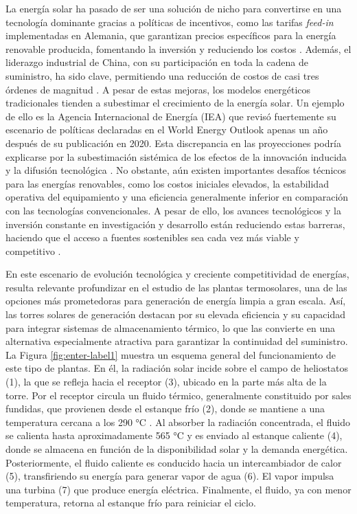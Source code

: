 \documentclass[11pt]{report}
\begin{document}
La energía solar ha pasado de ser una solución de nicho para convertirse en una tecnología dominante gracias a políticas de incentivos, como las tarifas \textit{feed-in} implementadas en Alemania, que garantizan precios específicos para la energía renovable producida, fomentando la inversión y reduciendo los costos \cite{wand2011feed}. Además, el liderazgo industrial de China, con su participación en toda la cadena de suministro, ha sido clave, permitiendo una reducción de costos de casi tres órdenes de magnitud \cite{Way}.
A pesar de estas mejoras, los modelos energéticos tradicionales tienden a subestimar el crecimiento de la energía solar. Un ejemplo de ello es la Agencia Internacional de Energía (IEA) que revisó fuertemente su escenario de políticas declaradas en el World Energy Outlook apenas un año después de su publicación en 2020. Esta discrepancia en las proyecciones podría explicarse por la subestimación sistémica de los efectos de la innovación inducida y la difusión tecnológica \cite{Way}.
No obstante, aún existen importantes desafíos técnicos para las energías renovables, como los costos iniciales elevados, la estabilidad operativa del equipamiento y una eficiencia generalmente inferior en comparación con las tecnologías convencionales. A pesar de ello, los avances tecnológicos y la inversión constante en investigación y desarrollo están reduciendo estas barreras, haciendo que el acceso a fuentes sostenibles sea cada vez más viable y competitivo \cite{Rajkumar}.

En este escenario de evolución tecnológica y creciente competitividad de energías, resulta relevante profundizar en el estudio de las plantas termosolares, una de las opciones más prometedoras para generación de energía limpia a gran escala. Así, las torres solares de generación destacan por su elevada eficiencia y su capacidad para integrar sistemas de almacenamiento térmico, lo que las convierte en una alternativa especialmente atractiva para garantizar la continuidad del suministro. La Figura \ref{fig:enter-label1} muestra un esquema general del funcionamiento de este tipo de plantas. En él, la radiación solar incide sobre el campo de heliostatos (1), la que se refleja hacia el receptor (3), ubicado en la parte más alta de la torre. Por el receptor circula un fluido térmico, generalmente constituido por sales fundidas, que provienen desde el estanque frío (2), donde se mantiene a una temperatura cercana a los 290 °C \cite{kalogirou2023solar}. Al absorber la radiación concentrada, el fluido se calienta hasta aproximadamente 565 °C \cite{kalogirou2023solar} y es enviado al estanque caliente (4), donde se almacena en función de la disponibilidad solar y la demanda energética. Posteriormente, el fluido caliente es conducido hacia un intercambiador de calor (5), transfiriendo su energía para generar vapor de agua (6). El vapor impulsa una turbina (7) que produce energía eléctrica. Finalmente, el fluido, ya con menor temperatura, retorna al estanque frío para reiniciar el ciclo. 
\end{document}
